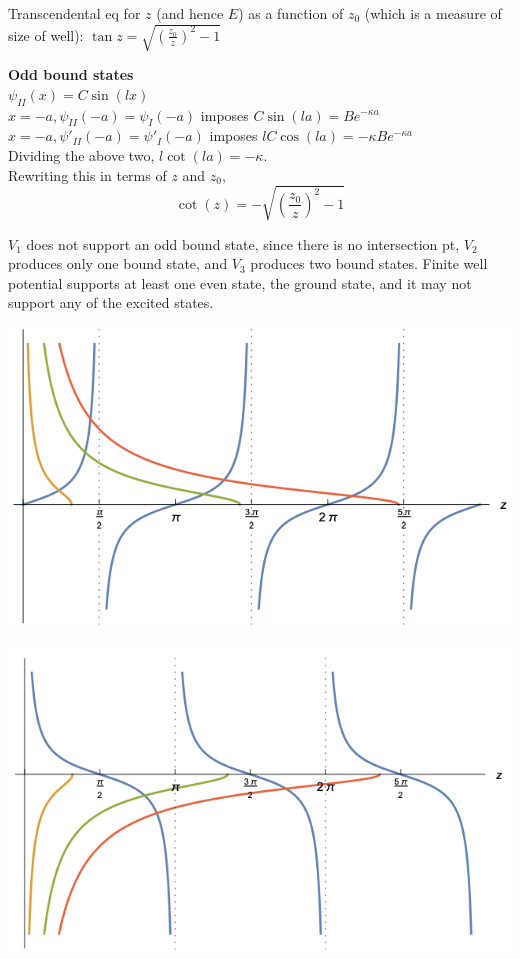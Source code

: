 Transcendental eq for $z$ (and hence $E$) as a function of $z_0$ (which is a measure of size of well): $\tan z = \sqrt{(\frac{z_0}{z})^2 - 1}$

\textbf{Odd bound states} \\
$\psi_{II}(x) = C \sin(lx)$ \\

$x = -a, \psi_{II}(-a) = \psi_{I}(-a)$ imposes $C \sin(la) = B e^{-\kappa a}$ \\
$x = -a, \psi'_{II}(-a) = \psi'_{I}(-a)$ imposes $l C \cos(la) = -\kappa B e^{-\kappa a}$ \\

Dividing the above two, $l \cot(la) = -\kappa$. \\
Rewriting this in terms of $z$ and $z_0$, $$\cot(z) = - \sqrt{(\frac{z_0}{z})^2 - 1}$$

$V_{1}$ does not support an odd bound state, since there is no intersection pt, $V_{2}$ produces only one bound state, and $V_{3}$ produces two bound states. Finite well potential supports at least one even state, the ground state, and it may not support any of the excited states.

\vspace{0em}
\begin{Figure}
    \raggedright
    \includegraphics[width=0.5\columnwidth]{figures/even_finite_square_well.png}
\end{Figure}
\vspace{-1em}

\vspace{-9em}
\begin{Figure}
    \raggedleft
    \includegraphics[width=0.5\columnwidth]{figures/odd_finite_square_well.png}
\end{Figure}
\vspace{-1em}

